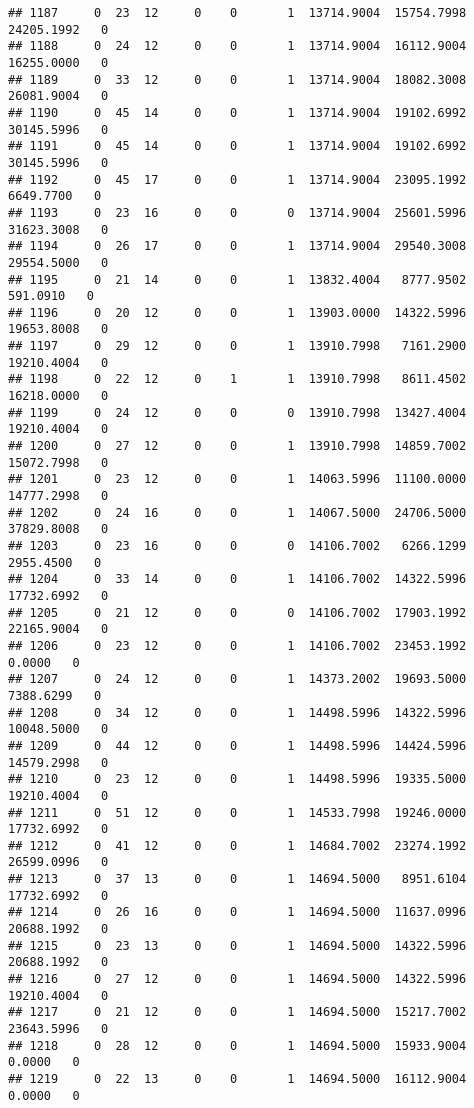 \documentclass[
]{article}
\begin{document}
\begin{enumerate}
\begin{verbatim}
## 1187     0  23  12     0    0       1  13714.9004  15754.7998  24205.1992   0
## 1188     0  24  12     0    0       1  13714.9004  16112.9004  16255.0000   0
## 1189     0  33  12     0    0       1  13714.9004  18082.3008  26081.9004   0
## 1190     0  45  14     0    0       1  13714.9004  19102.6992  30145.5996   0
## 1191     0  45  14     0    0       1  13714.9004  19102.6992  30145.5996   0
## 1192     0  45  17     0    0       1  13714.9004  23095.1992   6649.7700   0
## 1193     0  23  16     0    0       0  13714.9004  25601.5996  31623.3008   0
## 1194     0  26  17     0    0       1  13714.9004  29540.3008  29554.5000   0
## 1195     0  21  14     0    0       1  13832.4004   8777.9502    591.0910   0
## 1196     0  20  12     0    0       1  13903.0000  14322.5996  19653.8008   0
## 1197     0  29  12     0    0       1  13910.7998   7161.2900  19210.4004   0
## 1198     0  22  12     0    1       1  13910.7998   8611.4502  16218.0000   0
## 1199     0  24  12     0    0       0  13910.7998  13427.4004  19210.4004   0
## 1200     0  27  12     0    0       1  13910.7998  14859.7002  15072.7998   0
## 1201     0  23  12     0    0       1  14063.5996  11100.0000  14777.2998   0
## 1202     0  24  16     0    0       1  14067.5000  24706.5000  37829.8008   0
## 1203     0  23  16     0    0       0  14106.7002   6266.1299   2955.4500   0
## 1204     0  33  14     0    0       1  14106.7002  14322.5996  17732.6992   0
## 1205     0  21  12     0    0       0  14106.7002  17903.1992  22165.9004   0
## 1206     0  23  12     0    0       1  14106.7002  23453.1992      0.0000   0
## 1207     0  24  12     0    0       1  14373.2002  19693.5000   7388.6299   0
## 1208     0  34  12     0    0       1  14498.5996  14322.5996  10048.5000   0
## 1209     0  44  12     0    0       1  14498.5996  14424.5996  14579.2998   0
## 1210     0  23  12     0    0       1  14498.5996  19335.5000  19210.4004   0
## 1211     0  51  12     0    0       1  14533.7998  19246.0000  17732.6992   0
## 1212     0  41  12     0    0       1  14684.7002  23274.1992  26599.0996   0
## 1213     0  37  13     0    0       1  14694.5000   8951.6104  17732.6992   0
## 1214     0  26  16     0    0       1  14694.5000  11637.0996  20688.1992   0
## 1215     0  23  13     0    0       1  14694.5000  14322.5996  20688.1992   0
## 1216     0  27  12     0    0       1  14694.5000  14322.5996  19210.4004   0
## 1217     0  21  12     0    0       1  14694.5000  15217.7002  23643.5996   0
## 1218     0  28  12     0    0       1  14694.5000  15933.9004      0.0000   0
## 1219     0  22  13     0    0       1  14694.5000  16112.9004      0.0000   0

\end{verbatim}
\end{enumerate}
\end{document}
